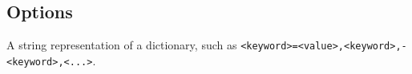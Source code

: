 \subsection{Options}
\label{options}

A string representation of a dictionary, such as \texttt{<keyword>=<value>,<keyword>,-<keyword>,<...>}.